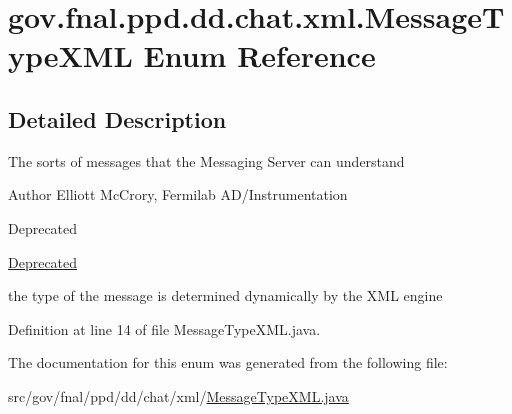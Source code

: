 \hypertarget{enumgov_1_1fnal_1_1ppd_1_1dd_1_1chat_1_1xml_1_1MessageTypeXML}{\section{gov.\-fnal.\-ppd.\-dd.\-chat.\-xml.\-Message\-Type\-X\-M\-L Enum Reference}
\label{enumgov_1_1fnal_1_1ppd_1_1dd_1_1chat_1_1xml_1_1MessageTypeXML}
}


\subsection{Detailed Description}
The sorts of messages that the Messaging Server can understand

\begin{DoxyAuthor}{Author}
Elliott Mc\-Crory, Fermilab A\-D/\-Instrumentation 
\end{DoxyAuthor}
\begin{DoxyRefDesc}{Deprecated}
\item[\hyperlink{deprecated__deprecated000004}{Deprecated}]
\begin{DoxyItemize}
\item the type of the message is determined dynamically by the X\-M\-L engine 
\end{DoxyItemize}\end{DoxyRefDesc}


Definition at line 14 of file Message\-Type\-X\-M\-L.\-java.



The documentation for this enum was generated from the following file\-:\begin{DoxyCompactItemize}
\item 
src/gov/fnal/ppd/dd/chat/xml/\hyperlink{MessageTypeXML_8java}{Message\-Type\-X\-M\-L.\-java}\end{DoxyCompactItemize}
